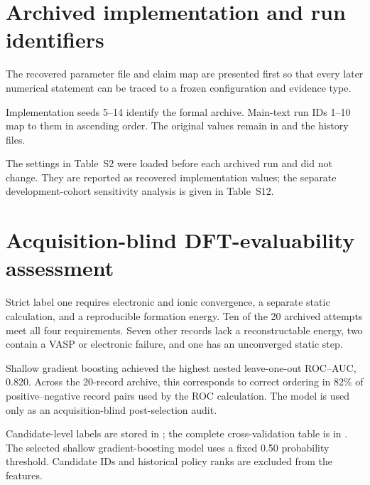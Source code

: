 \documentclass[cmc,article,submit,moreauthors,pdftex]{Definitions/tsp}
\begin{document}


\section{Archived implementation and run identifiers}

The recovered parameter file and claim map are presented first so that every
later numerical statement can be traced to a frozen configuration and evidence
type.





Implementation seeds 5--14 identify the formal archive. Main-text run IDs
1--10 map to them in ascending order. The original values remain in
 and the history files.

The settings in Table~S2 were loaded before each archived run and did not
change. They are reported as recovered implementation values; the separate
development-cohort sensitivity analysis is given in Table~S12.

\section{Acquisition-blind DFT-evaluability assessment}

Strict label one requires electronic and ionic convergence, a separate static
calculation, and a reproducible formation energy. Ten of the 20 archived
attempts meet all four requirements. Seven other records lack a reconstructable
energy, two contain a VASP or electronic failure, and one has an unconverged
static step.



Shallow gradient boosting achieved the highest nested leave-one-out ROC--AUC,
0.820. Across the 20-record archive, this corresponds to correct ordering in
82\% of positive--negative record pairs used by the ROC calculation. The model
is used only as an acquisition-blind post-selection audit.

Candidate-level labels are stored in
; the complete
cross-validation table is in
. The selected shallow
gradient-boosting model uses a fixed 0.50 probability threshold. Candidate IDs
and historical policy ranks are excluded from the features.
\end{document}
